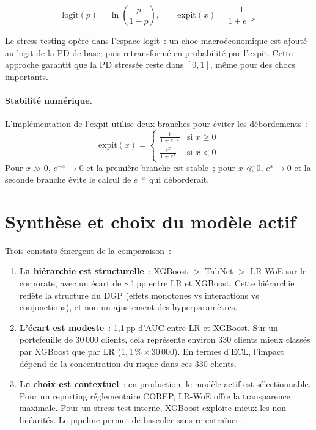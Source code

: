 \documentclass[12pt, a4paper, twoside, openright]{report}
\theoremstyle{definition}
\begin{document}
\begin{equation}
\text{logit}(p) = \ln\!\left(\frac{p}{1-p}\right), \qquad \text{expit}(x) = \frac{1}{1 + e^{-x}}
\label{eq:logit-expit}
\end{equation}

Le stress testing opère dans l'espace logit~: un choc macroéconomique est ajouté au logit de la PD de base, puis retransformé en probabilité par l'expit. Cette approche garantit que la PD stressée reste dans $[0, 1]$, même pour des chocs importants.

\paragraph{Stabilité numérique.} L'implémentation de l'expit utilise deux branches pour éviter les débordements~:
$$
\text{expit}(x) = \begin{cases}
\displaystyle\frac{1}{1 + e^{-x}} & \text{si } x \geq 0 \\[8pt]
\displaystyle\frac{e^x}{1 + e^x} & \text{si } x < 0
\end{cases}
$$
Pour $x \gg 0$, $e^{-x} \to 0$ et la première branche est stable~; pour $x \ll 0$, $e^x \to 0$ et la seconde branche évite le calcul de $e^{-x}$ qui déborderait.

\section{Synthèse et choix du modèle actif}
\label{sec:pd:synthese}

Trois constats émergent de la comparaison~:

\begin{enumerate}
  \item \textbf{La hiérarchie est structurelle}~: XGBoost $>$ TabNet $>$ LR-WoE sur le corporate, avec un écart de $\sim$1\,pp entre LR et XGBoost. Cette hiérarchie reflète la structure du DGP (effets monotones vs interactions vs conjonctions), et non un ajustement des hyperparamètres.

  \item \textbf{L'écart est modeste}~: 1{,}1\,pp d'AUC entre LR et XGBoost. Sur un portefeuille de 30\,000 clients, cela représente environ 330 clients mieux classés par XGBoost que par LR ($1{,}1\,\% \times 30\,000$). En termes d'ECL, l'impact dépend de la concentration du risque dans ces 330 clients.

  \item \textbf{Le choix est contextuel}~: en production, le modèle actif est sélectionnable. Pour un reporting réglementaire COREP, LR-WoE offre la transparence maximale. Pour un stress test interne, XGBoost exploite mieux les non-linéarités. Le pipeline permet de basculer sans re-entraîner.
\end{enumerate}
\end{document}
